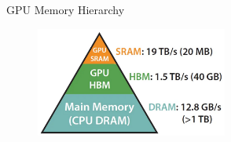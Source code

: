 \begin{vbframe}{GPU Memory Hierarchy}

\vfill
\begin{minipage}[c]{.49\textwidth}
	\begin{figure}
	\centering
	\includegraphics[width = 6.3cm]{./figure/gpu_mem.png} \\ 
\end{figure}
\end{minipage}
\begin{minipage}[c]{.49\textwidth}
\vfill
	\begin{figure}
		\centering
		\\ 
	\end{figure}
	\vfill
\end{minipage}
\hfill


\vfill

\end{vbframe}


